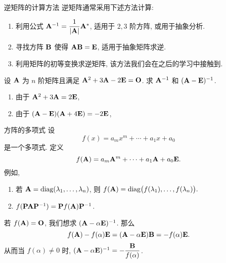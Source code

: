 \begin{frame}{逆矩阵的计算方法}
	\onslide<+->
	逆矩阵通常采用下述方法计算:
	\begin{enumerate}
		\item 利用公式 ${\mathbf{A}}^{-1}=\dfrac1{|{\mathbf{A}}|}{\mathbf{A}}^*$, 适用于 $2,3$ 阶方阵, 或用于抽象分析.
		\item 寻找方阵 ${\mathbf{B}}$ 使得 ${\mathbf{A}}{\mathbf{B}}={\mathbf{E}}$, 适用于抽象矩阵求逆.
		\item 利用矩阵的初等变换求逆矩阵, 该方法我们会在之后的学习中接触到.
	\end{enumerate}
	\onslide<+->
	\begin{example}
		设 ${\mathbf{A}}$ 为 $n$ 阶矩阵且满足 ${\mathbf{A}}^2+3{\mathbf{A}}-2{\mathbf{E}}={\mathbf{O}}$.
		求 ${\mathbf{A}}^{-1}$ 和 $({\mathbf{A}}-{\mathbf{E}})^{-1}$.
	\end{example}
	\onslide<+->
	\begin{solution}
		\begin{enumerate}
			\item 由于 ${\mathbf{A}}^2+3{\mathbf{A}}=2{\mathbf{E}}$, 
			\onslide<+->{%
			因此 $\bfA(\bfA+3\bfE)=2\bfE, \bfA^{-1}=\dfrac{\bfA+3\bfE}2$.}
			\item 由于 $({\mathbf{A}}-{\mathbf{E}})({\mathbf{A}}+4{\mathbf{E}})=-2{\mathbf{E}}$,
			\onslide<+->{%
			因此 $(\bfA-\bfE)^{-1}=-\dfrac{\bfA+4\bfE}2$.}
		\end{enumerate}
	\end{solution}
\end{frame}


\begin{frame}{方阵的多项式}
	\onslide<+->
	设
	\[f(x)=a_mx^m+\cdots+a_1x+a_0\]
	是一个多项式.
	\onslide<+->
	定义
	\[f({\mathbf{A}})=a_m{\mathbf{A}}^m+\cdots+a_1{\mathbf{A}}+a_0{\mathbf{E}}.\]
	\onslide<+->
	例如, 
	\begin{enumerate}
		\item 若 ${\mathbf{A}}={\mathrm{diag}}(\lambda_1,\dots,\lambda_n)$, 则 $f({\mathbf{A}})={\mathrm{diag}}\bigl(f(\lambda_1),\dots,f(\lambda_n)\bigr).$
		\item $f({\mathbf{P}}{\mathbf{A}}{\mathbf{P}}^{-1})={\mathbf{P}} f({\mathbf{A}}){\mathbf{P}}^{-1}$.
	\end{enumerate}

	\onslide<+->
	若 $f({\mathbf{A}})={\mathbf{O}}$, 我们想求 $({\mathbf{A}}-\alpha{\mathbf{E}})^{-1}$.
	\onslide<+->
	那么
	\[f({\mathbf{A}})-f(\alpha){\mathbf{E}}=({\mathbf{A}}-\alpha{\mathbf{E}}){\mathbf{B}}=-f(\alpha){\mathbf{E}}.\]
	\onslide<+->
	从而当 $f(\alpha)\neq 0$ 时, $({\mathbf{A}}-\alpha{\mathbf{E}})^{-1}=-\dfrac{{\mathbf{B}}}{f(\alpha)}$.
\end{frame}



